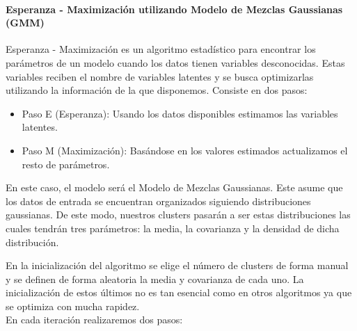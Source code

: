 \documentclass[conference,a4paper]{IEEEtran}
\begin{document}
\paragraph{\textbf{Esperanza - Maximización utilizando Modelo de Mezclas Gaussianas (GMM)}}

Esperanza - Maximización es un algoritmo estadístico para encontrar los parámetros de un modelo cuando los datos tienen variables desconocidas. Estas variables reciben el nombre de variables latentes y se busca optimizarlas utilizando la información de la que disponemos. Consiste en dos pasos:
\begin{itemize}
	\item Paso E (Esperanza): Usando los datos disponibles estimamos las variables latentes.\\
	\item Paso M (Maximización): Basándose en los valores estimados actualizamos el resto de parámetros.\\
\end{itemize}

En este caso, el modelo será el Modelo de Mezclas Gaussianas. Este asume que los datos de entrada se encuentran organizados siguiendo distribuciones gaussianas. De este modo, nuestros clusters pasarán a ser estas distribuciones las cuales tendrán tres parámetros: la media, la covarianza y la densidad de dicha distribución.

En la inicialización del algoritmo se elige el número de clusters de forma manual y se definen de forma aleatoria la media y covarianza de cada uno. La inicialización de estos últimos no es tan esencial como en otros algoritmos ya que se optimiza con mucha rapidez.\\
En cada iteración realizaremos dos pasos:\\
\end{document}
